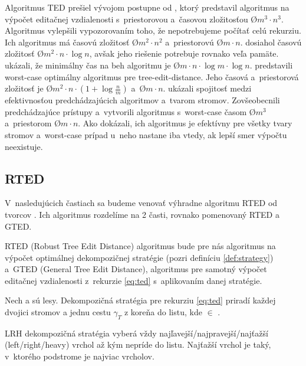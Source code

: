 Algoritmus TED prešiel vývojom postupne od \citet{TAI}, ktorý predstavil algoritmus
na výpočet editačnej vzdialenosti s~priestorovou a~časovou zložitosťou
\O{$m^3 \cdot n^3$}. Algoritmus vylepšili \citet{ZHANGSHASHA} vypozorovaním toho,
že nepotrebujeme počítať celú rekurziu. Ich algoritmus má časovú zložitosť \O{$m^2 \cdot n^2$}
a~priestorovú \O{$m \cdot n$}. \citet{KLEIN} dosiahol časovú zložitosť \O{$m^2 \cdot n \cdot \log{n}$},
avšak jeho riešenie potrebuje rovnako veľa pamäte.
\citet{DALUCQ} ukázali, že minimálny čas na beh algoritmu je \O{$m \cdot n \cdot \log{m} \cdot \log{n}$}.
\citet{DMRW} predstavili worst-case optimálny algoritmus pre tree-edit-distance.
Jeho časová a~priestorová zložitosť je \O{$m^2 \cdot n \cdot (1 + \log{\frac{n}{m}})$}
a~\O{$m \cdot n$}. \citet{RTED} ukázali spojitosť medzi efektivnosťou predchádzajúcich algoritmov
a~tvarom stromov. Zovšeobecnili predchádzajúce prístupy a~vytvorili algoritmus
s~worst-case časom \O{$m^3$} a~priestorom \O{$m \cdot n$}.
Ako dokázali, ich algoritmus je efektívny pre všetky tvary stromov a~worst-case
prípad u~neho nastane iba vtedy, ak lepší smer výpočtu neexistuje.





\subsection{RTED}

V~nasledujúcich častiach sa budeme venovať výhradne algoritmu RTED od tvorcov \citet{RTED}.
Ich algoritmus rozdelíme na 2 časti, rovnako pomenovaný RTED a GTED.

RTED (Robust Tree Edit Distance) algoritmus bude pre nás algoritmus na výpočet
optimálnej dekompozičnej stratégie (pozri definíciu \ref{def:strategy})
a~GTED (General Tree Edit Distance), algoritmus pre samotný výpočet editačnej
vzdialenosti z~rekurzie \ref{eq:ted} s~aplikovaním danej stratégie.

\begin{definice}
  \label{def:strategy}
  Nech  a  sú lesy. Dekompozičná stratégia pre rekurziu \ref{eq:ted} priradí
  každej dvojici stromov  a  jednu cestu $\gamma_{T}$
  z koreňa do listu, kde  $\in$ .

	LRH dekompozičná stratégia vyberá vždy najľavejší/najpravejší/najťažší
	(left/right/heavy) vrchol až kým nepríde do listu. Najťažší vrchol je taký,
	v~ktorého podstrome je najviac vrcholov. 
\end{definice}

